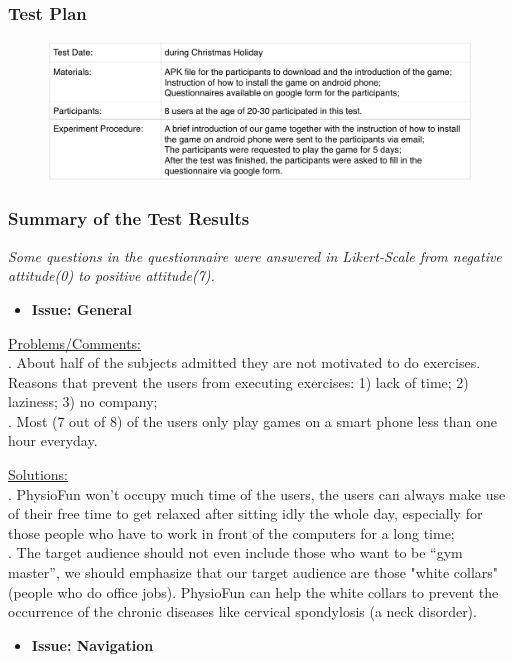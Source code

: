 \documentclass{article}
\begin{document}
\subsubsection{Test Plan}
\begin{figure}[H]
  \centering
  \includegraphics[width=0.9\linewidth]{TestPlan2.png}
\end{figure}


\subsubsection{Summary of the Test Results}
\textit{Some questions in the questionnaire were answered in Likert-Scale from negative attitude(0) to positive attitude(7).}
\begin{itemize}
    \item{\textbf{Issue: General}}
\end{itemize}

\underline{Problems/Comments:} \\. About half of the subjects admitted they are not motivated to do exercises. Reasons that prevent the users from executing exercises: 1) lack of time; 2) laziness; 3) no company; \\
. Most (7 out of 8) of the users only play games on a smart phone less than one hour everyday.

\underline{Solutions:} \\. PhysioFun won’t occupy much time of the users, the users can always make use of their free time to get relaxed after sitting idly the whole day, especially for those people who have to work in front of the computers for a long time;\\
. The target audience should not even include those who want to be “gym master”, we should emphasize that our target audience are those "white collars" (people who do office jobs). PhysioFun can help the white collars to prevent the occurrence of the chronic diseases like cervical spondylosis (a neck disorder).


\begin{itemize}
    \item{\textbf{Issue: Navigation}}
\end{itemize}
\end{document}
